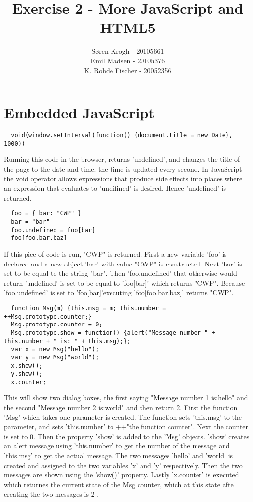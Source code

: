 \documentclass[a4paper,10pt]{article}
\author{
Søren Krogh -  20105661 \\
Emil Madsen - 20105376  \\
K. Rohde Fischer - 20052356\\}
\title{Exercise 2 - More JavaScript and HTML5}
\begin{document}
\maketitle

\section*{Embedded JavaScript}

\begin{verbatim}
  void(window.setInterval(function() {document.title = new Date}, 1000))
\end{verbatim}
Running this code in the browser, returns 'undefined', and changes the title of the page to the date and time. the time is updated every second.
In JavaScript the void operator allows expressions that produce side effects into places where an expression that evaluates to 'undifined' is desired. Hence 'undefined' is returned.

\begin{verbatim}
  foo = { bar: "CWP" }
  bar = "bar"
  foo.undefined = foo[bar]
  foo[foo.bar.baz]
\end{verbatim}
If this pice of code is run, "CWP" is returned.
First a new variable 'foo' is declared and a new object 'bar' with value "CWP" is constructed. Next 'bar' is set to be equal to the string "bar". Then 'foo.undefined' that otherwise would return 'undefined' is set to be equal to 'foo[bar]' which returns "CWP".
Because 'foo.undefined' is set to 'foo[bar]'executing 'foo[foo.bar.baz]' returns "CWP". 


\begin{verbatim}
  function Msg(m) {this.msg = m; this.number = ++Msg.prototype.counter;}
  Msg.prototype.counter = 0;
  Msg.prototype.show = function() {alert("Message number " + this.number + " is: " + this.msg);};
  var x = new Msg("hello");
  var y = new Msg("world");
  x.show();
  y.show();
  x.counter;
\end{verbatim}
This will show two dialog boxes, the first saying "Message number 1 is:hello" and the second "Message number 2 is:world" and then return 2.
First the function 'Msg' which takes one parameter is created. The function sets 'this.msg' to the parameter, and sets 'this.number' to ++"the function counter".
Next the counter is set to 0.
Then the property 'show' is added to the 'Msg' objects. 'show' creates an alert message using 'this.number' to get the number of the message and 'this.msg' to get the actual message. The two messages 'hello' and 'world' is created and assigned to the two variables 'x' and 'y' respectively. Then the two messages are shown using the 'show()' property. Lastly 'x.counter' is executed which returnes the current state of the Msg counter, which at this state afte creating the two messages is 2 .
\end{document}
